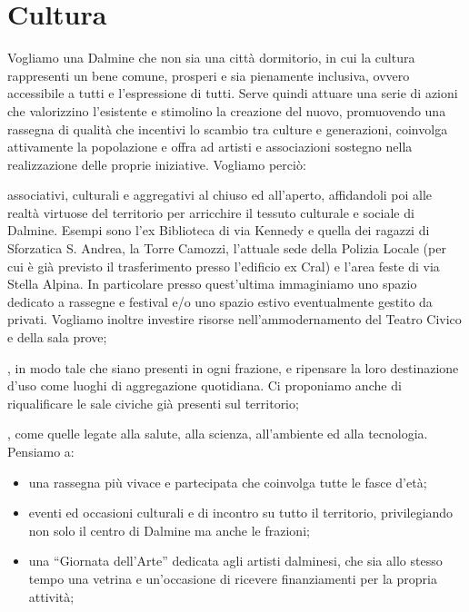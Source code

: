\section{Cultura}
Vogliamo una Dalmine che non sia una città dormitorio, in cui la cultura rappresenti un bene comune, prosperi e sia pienamente inclusiva, ovvero accessibile a tutti e l'espressione di tutti. Serve quindi attuare una serie di azioni che valorizzino l'esistente e stimolino la creazione del nuovo, promuovendo una rassegna di qualità che incentivi lo scambio tra culture e generazioni, coinvolga attivamente la popolazione e offra ad artisti e associazioni sostegno nella realizzazione delle proprie iniziative. Vogliamo perciò:

 associativi, culturali e aggregativi al chiuso ed all'aperto, affidandoli poi alle realtà virtuose del territorio per arricchire il tessuto culturale e sociale di Dalmine. Esempi sono l'ex Biblioteca di via Kennedy e quella dei ragazzi di Sforzatica S. Andrea, la Torre Camozzi, l'attuale sede della Polizia Locale (per cui è già previsto il trasferimento presso l'edificio ex Cral) e l'area feste di via Stella Alpina. In particolare presso quest'ultima immaginiamo uno spazio dedicato a rassegne e festival e/o uno spazio estivo eventualmente gestito da privati. Vogliamo inoltre investire risorse nell'ammodernamento del Teatro Civico e della sala prove;

, in modo tale che siano presenti in ogni frazione, e  ripensare la loro destinazione d'uso come luoghi di aggregazione quotidiana. Ci proponiamo anche di riqualificare le sale civiche già presenti sul territorio; 

\begin{bluebox}
, come quelle legate alla salute, alla scienza, all'ambiente ed alla tecnologia. Pensiamo a:
\begin{itemize}
  \item una rassegna più vivace e partecipata che coinvolga tutte le fasce d'età;
  \item eventi ed occasioni culturali e di incontro su tutto il territorio, privilegiando non solo il centro di Dalmine ma anche le frazioni;
  \item una ``Giornata dell'Arte'' dedicata agli artisti dalminesi, che sia allo stesso tempo una vetrina e un'occasione di ricevere finanziamenti per la propria attività; 
\end{itemize}
\end{bluebox}

